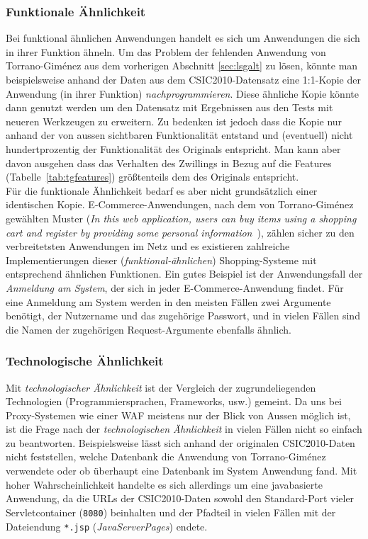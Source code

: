 \subsubsection{Funktionale Ähnlichkeit}
Bei funktional ähnlichen Anwendungen handelt es sich um Anwendungen die sich in ihrer Funktion ähneln. Um das Problem der fehlenden Anwendung von Torrano-Giménez aus dem vorherigen Abschnitt \ref{sec:lsgalt}  zu lösen, könnte man beispielsweise anhand der Daten aus dem CSIC2010-Datensatz eine 1:1-Kopie der Anwendung (in ihrer Funktion) \glqq\emph{nachprogrammieren}\grqq. Diese ähnliche Kopie könnte dann genutzt werden um den Datensatz mit Ergebnissen aus den Tests mit neueren Werkzeugen zu erweitern. Zu bedenken ist jedoch dass die Kopie nur anhand der von aussen sichtbaren Funktionalität entstand und (eventuell) nicht hundertprozentig der Funktionalität des Originals entspricht. Man kann aber davon ausgehen dass das Verhalten des Zwillings in Bezug auf die Features (Tabelle~\ref{tab:tgfeatures}) größtenteils dem des Originals entspricht.\\
Für die funktionale Ähnlichkeit bedarf es aber nicht grundsätzlich einer identischen Kopie. E-Commerce-Anwendungen, nach dem von Torrano-Giménez gewählten Muster (\glqq\emph{In this web application, users can buy items using a shopping cart and register by providing some personal information}\grqq{}~\cite{csic2010}), zählen sicher zu den verbreitetsten Anwendungen im Netz und es existieren zahlreiche Implementierungen dieser (\emph{funktional-ähnlichen}) Shopping-Systeme mit entsprechend ähnlichen Funktionen. Ein gutes Beispiel ist der Anwendungsfall der \emph{Anmeldung am System}, der sich in jeder E-Commerce-Anwendung findet. Für eine Anmeldung am System werden in den meisten Fällen zwei Argumente benötigt, der Nutzername und das zugehörige Passwort, und in vielen Fällen sind die Namen der zugehörigen Request-Argumente ebenfalls ähnlich. 

\subsubsection{Technologische Ähnlichkeit}
Mit \emph{technologischer Ähnlichkeit} ist der Vergleich der zugrundeliegenden Technologien (Programmiersprachen, Frameworks, usw.) gemeint. Da uns bei Proxy-Systemen wie einer WAF meistens nur der Blick von Aussen möglich ist, ist die Frage nach der \emph{technologischen Ähnlichkeit} in vielen Fällen nicht so einfach zu beantworten. Beispielsweise lässt sich anhand der originalen CSIC2010-Daten nicht feststellen, welche Datenbank die Anwendung von Torrano-Giménez verwendete oder ob überhaupt eine Datenbank im System Anwendung fand. Mit hoher Wahrscheinlichkeit handelte es sich allerdings um eine javabasierte Anwendung, da die URLs der CSIC2010-Daten sowohl den Standard-Port vieler Servletcontainer (\verb=8080=) beinhalten und der Pfadteil in vielen Fällen mit der Dateiendung \verb=*.jsp= (\emph{JavaServerPages}) endete.\\

